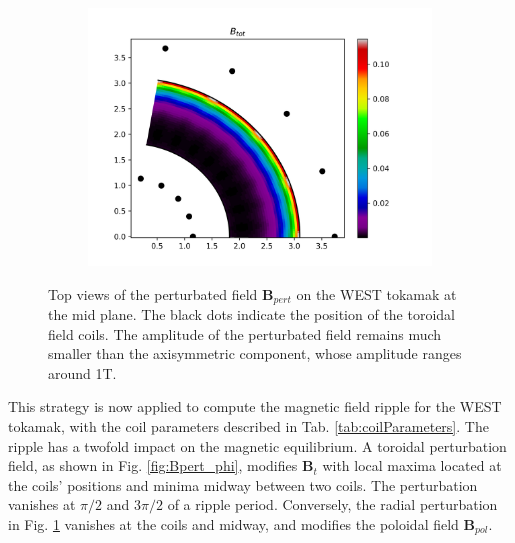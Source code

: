 \begin{figure}[H]
\begin{subfigure}[t]{0.3\textwidth}
		\label{fig:Bpert_psi}
	\end{subfigure}
	\begin{subfigure}[t]{0.3\textwidth}
		\centering
		\includegraphics[width=1\textwidth]{schemes/rippleBtot.png}
	\end{subfigure}
	\caption[Top views of the perturbated field $\textbf{B}_{pert}$ on the WEST tokamak at the mid plane]{Top views of the perturbated field $\textbf{B}_{pert}$ on the WEST tokamak at the mid plane. The black dots indicate the position of the toroidal field coils. The  amplitude of the perturbated field remains much smaller than the axisymmetric component, whose amplitude ranges around 1T.}
	\label{fig:Bpert_fields}
\end{figure}

This strategy is now applied to compute the magnetic field ripple for the WEST tokamak, with the coil parameters described in Tab. \ref{tab:coilParameters}. The ripple has a twofold impact on the magnetic equilibrium. A toroidal perturbation field, as shown in Fig. \ref{fig:Bpert_phi}, modifies $\textbf{B}_t$ with local maxima located at the coils' positions and minima midway between two coils. The perturbation vanishes at $\pi/2$ and $3\pi/2$ of a ripple period. Conversely, the radial perturbation in Fig. \ref{fig:Bpert_psi} vanishes at the coils and midway, and modifies the poloidal field $\textbf{B}_{pol}$.

